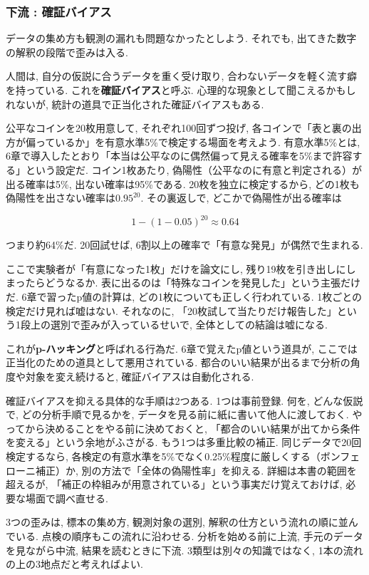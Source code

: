 \subsubsection*{下流 : 確証バイアス}

データの集め方も観測の漏れも問題なかったとしよう.
それでも, 出てきた数字の解釈の段階で歪みは入る.

人間は, 自分の仮説に合うデータを重く受け取り, 合わないデータを軽く流す癖を持っている.
これを\textbf{確証バイアス}と呼ぶ.
心理的な現象として聞こえるかもしれないが, 統計の道具で正当化された確証バイアスもある.

公平なコインを20枚用意して, それぞれ100回ずつ投げ, 各コインで「表と裏の出方が偏っているか」を有意水準5\%で検定する場面を考えよう.
有意水準5\%とは, 6章で導入したとおり「本当は公平なのに偶然偏って見える確率を5\%まで許容する」という設定だ.
コイン1枚あたり, 偽陽性（公平なのに有意と判定される）が出る確率は5\%, 出ない確率は95\%である.
20枚を独立に検定するから, どの1枚も偽陽性を出さない確率は$0.95^{20}$. その裏返しで, どこかで偽陽性が出る確率は

$$
1 - (1 - 0.05)^{20} \approx 0.64
$$

つまり約64\%だ. 20回試せば, 6割以上の確率で「有意な発見」が偶然で生まれる.

ここで実験者が「有意になった1枚」だけを論文にし, 残り19枚を引き出しにしまったらどうなるか.
表に出るのは「特殊なコインを発見した」という主張だけだ.
6章で習ったp値の計算は, どの1枚についても正しく行われている.
1枚ごとの検定だけ見れば嘘はない.
それなのに, 「20枚試して当たりだけ報告した」という1段上の選別で歪みが入っているせいで, 全体としての結論は嘘になる.

これが\textbf{p-ハッキング}と呼ばれる行為だ.
6章で覚えたp値という道具が, ここでは正当化のための道具として悪用されている.
都合のいい結果が出るまで分析の角度や対象を変え続けると, 確証バイアスは自動化される.

確証バイアスを抑える具体的な手順は2つある.
1つは事前登録. 何を, どんな仮説で, どの分析手順で見るかを, データを見る前に紙に書いて他人に渡しておく.
やってから決めることをやる前に決めておくと, 「都合のいい結果が出てから条件を変える」という余地がふさがる.
もう1つは多重比較の補正. 同じデータで20回検定するなら, 各検定の有意水準を5\%でなく0.25\%程度に厳しくする（ボンフェローニ補正）か, 別の方法で「全体の偽陽性率」を抑える.
詳細は本書の範囲を超えるが, 「補正の枠組みが用意されている」という事実だけ覚えておけば, 必要な場面で調べ直せる.

3つの歪みは, 標本の集め方, 観測対象の選別, 解釈の仕方という流れの順に並んでいる. 点検の順序もこの流れに沿わせる.
分析を始める前に上流, 手元のデータを見ながら中流, 結果を読むときに下流.
3類型は別々の知識ではなく, 1本の流れの上の3地点だと考えればよい.

